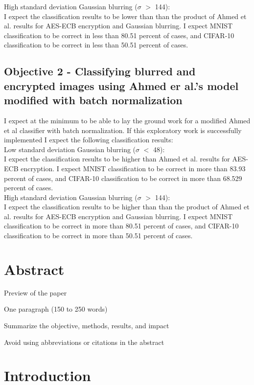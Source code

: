 \documentclass[12pt, titlepage]{article}
\begin{document}
\noindent High standard deviation Gaussian blurring ($\sigma$ $>$ 144):\\ I expect the classification results to be lower than than the product of Ahmed et al. results for AES-ECB encryption and Gaussian blurring.  I expect MNIST classification to be correct in less than 80.51 percent of cases, and CIFAR-10 classification to be correct in less than 50.51 percent of cases.\\

\subsection{Objective 2 - Classifying blurred and encrypted images using Ahmed er al.'s model modified with  batch normalization}
I expect at the minimum to be able to lay the ground work for a modified Ahmed et al classifier with batch normalization. If this exploratory work is successfully implemented I expect the following classification results:\\

\noindent Low standard deviation Gaussian blurring ($\sigma$ $<$ 48):\\ I expect the classification results to be higher than Ahmed et al. results for AES-ECB encryption. I expect MNIST classification to be correct in more than 83.93 percent of cases, and CIFAR-10 classification to be correct in more than 68.529 percent of cases.\\

\noindent High standard deviation Gaussian blurring ($\sigma$ $>$ 144):\\ I expect the classification results to be higher than than the product of Ahmed et al. results for AES-ECB encryption and Gaussian blurring.  I expect MNIST classification to be correct in more than 80.51 percent of cases, and CIFAR-10 classification to be correct in more than 50.51 percent of cases.\\

\section{Abstract}

Preview of the paper

One paragraph (150 to 250 words)

Summarize the objective, methods, 
results, and impact

Avoid using abbreviations or citations 
in the abstract

\section{Introduction}
\end{document}
